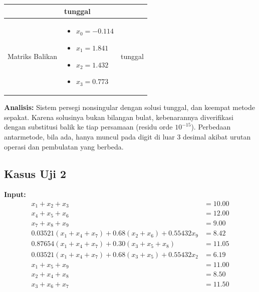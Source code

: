 \documentclass[12pt,a4paper]{report}
\begin{document}
\begin{table}[H]
\begin{tabular}{|l|p{5cm}|l|}
        & tunggal \\
        \hline
        Matriks Balikan & 
        \begin{itemize}
            \item $x_0 = -0.114$
            \item $x_1 = 1.841$
            \item $x_2 = 1.432$
            \item $x_3 = 0.773$
        \end{itemize}
        & tunggal \\
        \hline
    \end{tabular}
\end{table}

\textbf{Analisis:} Sistem persegi nonsingular dengan solusi tunggal, dan keempat metode sepakat. Karena solusinya bukan bilangan bulat, kebenarannya diverifikasi dengan substitusi balik ke tiap persamaan (residu orde $10^{-15}$). Perbedaan antarmetode, bila ada, hanya muncul pada digit di luar 3 desimal akibat urutan operasi dan pembulatan yang berbeda.

\subsection{Kasus Uji 2}
\textbf{Input:}
\begin{align*}
x_1 + x_2 + x_3 &= 10.00 \\
x_4 + x_5 + x_6 &= 12.00 \\
x_7 + x_8 + x_9 &= 9.00 \\
0.03521(x_1 + x_4 + x_7) + 0.68(x_2 + x_6) + 0.55432x_9 &= 8.42 \\
0.87654(x_1 + x_4 + x_7) + 0.30(x_3 + x_5 + x_8) &= 11.05 \\
0.03521(x_1 + x_4 + x_7) + 0.68(x_3 + x_5) + 0.55432x_2 &= 6.19 \\
x_1 + x_5 + x_9 &= 11.00 \\
x_2 + x_4 + x_8 &= 8.50 \\
x_3 + x_6 + x_7 &= 11.50
\end{align*}
\end{document}
